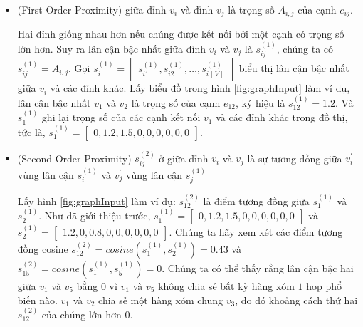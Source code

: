 \begin{itemize}
	\item
	\begin{definition}\label{def:firstOrderProximity}
		(First-Order Proximity)	giữa đỉnh $v_i$ và đỉnh $v_j$ là trọng số $A_{i, j}$ của cạnh $e_{ij}$.
	\end{definition}
	
	Hai đỉnh giống nhau hơn nếu chúng được kết nối bởi một cạnh có trọng số lớn hơn. Suy ra lân cận bậc nhất giữa đỉnh $v_i$ và $v_j$ là $s^{(1)}_{ij}$, chúng ta có $s^{(1)}_{ij} = A_{i, j}$. Gọi $s^{(1)}_{i} = \begin{bmatrix} s^{(1)}_{i1}, s^{(1)}_{i2}, \dots, s^{(1)}_{i \mid V \mid} \end{bmatrix}$ biểu thị lân cận bậc nhất giữa \(v_i\) và các đỉnh khác. Lấy biểu đồ trong hình \ref{fig:graphInput} làm ví dụ, lân cận bậc nhất $v_1$ và $v_2$ là trọng số của cạnh $e_{12}$, ký hiệu là $s^{(1)}_{12} = 1.2$. Và $s^{(1)}_1$ ghi lại trọng số của các cạnh kết nối $v_1$ và các đỉnh khác trong đồ thị, tức là, $s^{(1)}_{1} = \begin{bmatrix}  0, 1.2, 1.5, 0, 0, 0, 0, 0, 0 \end{bmatrix} $.
	
	\item
	\begin{definition}\label{def:secondOrderProximity} (Second-Order Proximity)
		$s^{(2)}_{ij}$ ở giữa đỉnh $v_i$ và $v_j$ là sự tương đồng giữa $v^{\prime}_i$ vùng lân cận $s^{(1)}_i$ và $v^{\prime}_j$ vùng lân cận $s^{(1)}_j$
	\end{definition}
	
	Lấy hình \ref{fig:graphInput} làm ví dụ: $s^{(2)}_{12}$ là điểm tương đồng giữa $s^{(1)}_{1}$ và $s^{(1)}_{2}$. Như đã giới thiệu trước, $s^{(1)}_1 = \begin{bmatrix} 0, 1.2, 1.5, 0, 0, 0, 0, 0, 0 \end{bmatrix}$ và $s^{(1)}_2 = \begin{bmatrix} 1.2, 0, 0.8, 0, 0, 0, 0 , 0, 0 \end{bmatrix}$. Chúng ta hãy xem xét các điểm tương đồng cosine $s^{(2)}_{12} = cosine (s^{(1)}_1, s^{(1)}_2) = 0.43$ và $s^{(2)}_{15} = cosine(s^{(1)}_1, s^{(1)}_5) = 0$. Chúng ta có thể thấy rằng lân cận bậc hai giữa $v_1$ và $v_5$ bằng $0$ vì $v_1$ và $v_5$ không chia sẻ bất kỳ hàng xóm $1$ hop phổ biến nào. $v_1$ và $v_2$ chia sẻ một hàng xóm chung $v_3$, do đó khoảng cách thứ hai $s^{(2)}_{12}$ của chúng lớn hơn 0.
	

\end{itemize}
